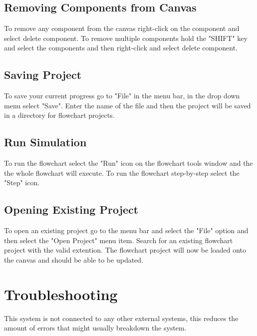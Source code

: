 \documentclass[11pt,a4paper,titlepage]{article}
\begin{document}
	\subsection{Removing Components from Canvas}
	
	To remove any component from the canvas right-click on the component and select delete component. To remove multiple components hold the "SHIFT" key and select the components and then right-click and select delete component.
		
	\subsection{Saving Project}
	
	To save your current progress go to "File" in the menu bar, in the drop down menu select "Save". Enter the name of the file and then the project will be saved in a directory for flowchart projects.
	
	\subsection{Run Simulation}
	To run the flowchart select the "Run" icon on the flowchart tools window and the the whole flowchart will execute. To run the flowchart step-by-step select the "Step" icon.
	
		
	\subsection{Opening Existing Project}
	
	To open an existing project go to the menu bar and select the "File" option and then select the "Open Project" menu item. Search for an existing flowchart project with the valid extention. The flowchart project will now be loaded onto the canvas and should be able to be updated.
	
\section{Troubleshooting}

This system is not connected to any other external systems, this reduces the amount of errors that might usually breakdown the system.
\end{document}
